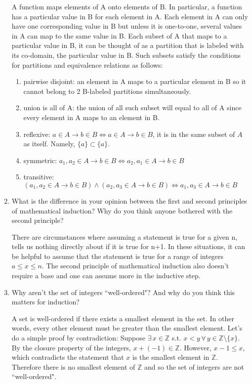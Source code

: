 \documentclass{article}
\begin{document}
\begin{enumerate}
\begin{flushleft}
A function maps elements of A onto elements of B. In particular, a function has a particular value in B for each element in A. Each element in A can only have one corresponding value in B but unless it is one-to-one, several values in A can map to the same value in B. Each subset of A that maps to a particular value in B, it can be thought of as a partition that is labeled with its co-domain, the particular value in B. Such subsets satisfy the conditions for partitions and equivalence relations as follows:
\begin{enumerate}
    \item pairwise disjoint: an element in A maps to a particular element in B so it cannot belong to 2 B-labeled partitions simultaneously.
    \item union is all of A: the union of all such subset will equal to all of A since every element in A maps to an element in B.
    \item reflexive: $a \in A \to b \in B \Leftrightarrow a \in A \to b \in B$, it is in the same subset of $A$ as itself. Namely, $\{a\} \subset \{a\}$.
    \item symmetric: $a_1,a_2 \in A \to b \in B \Leftrightarrow a_2,a_1 \in A \to b \in B$
    \item transitive: $(a_1,a_2 \in A \to b \in B) \wedge (a_2,a_3 \in A \to b \in B) \Leftrightarrow a_1,a_3 \in A \to b \in B$
\end{enumerate}
\end{flushleft}

\item What is the difference in your opinion between the first and second principles of mathematical induction? Why do you think anyone bothered with the second principle?

\begin{flushleft}
There are circumstances where assuming a statement is true for a given n, tells us nothing directly about if it is true for n+1. In these situations, it can be helpful to assume that the statement is true for a range of integers $a \leq x \leq n$. The second principle of mathematical induction also doesn't require a base and one can assume more in the inductive step.
\end{flushleft}

\item Why aren't the set of integers ``well-ordered"? And why do you think this matters for induction?

\begin{flushleft}
A set is well-ordered if there exists a smallest element in the set. In other words, every other element must be greater than the smallest element. Let's do a simple proof by contradiction: \newline
Suppose $\exists \, x \in \mathbb{Z}$ s.t. $x < y \, \forall \, y \in \mathbb{Z} \setminus \{x\}$. By the closure property of the integers, $x + (-1) \in \mathbb{Z}$. However, $x - 1 \leq x$, which contradicts the statement that $x$ is the smallest element in $\mathbb{Z}$. Therefore there is no smallest element of $\mathbb{Z}$ and so the set of integers are not ``well-ordered".
\end{flushleft}


\end{enumerate}
\end{document}
